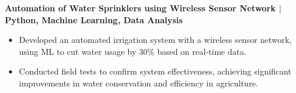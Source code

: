 \documentclass{article}
\begin{document}
\noindent \textbf{Automation of Water Sprinklers using Wireless Sensor Network $\mid$ {\small Python, Machine Learning, Data Analysis}}
\begin{itemize}[noitemsep,nolistsep,leftmargin=*]
\item {\small Developed an automated irrigation system with a wireless sensor network, using ML to cut water usage by 30\% based on real-time data.}
\item {\small Conducted field tests to confirm system effectiveness, achieving significant improvements in water conservation and efficiency in agriculture.}
\end{itemize}




\end{document}
